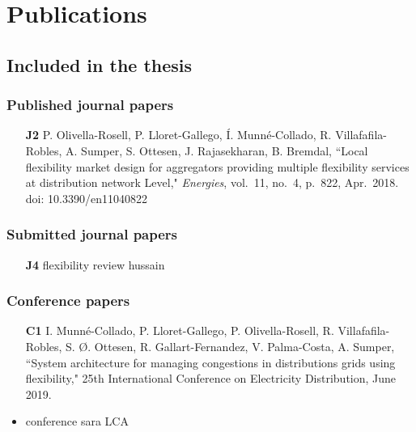 \chapter{Publications}


\section*{Included in the thesis}
\subsection*{Published journal papers}

\begin{itemize}
	
	\item [\textbf{J2}] P. Olivella-Rosell, P. Lloret-Gallego, \'{I}. Munn\'{e}-Collado, R. Villafafila-Robles, A. Sumper, S. Ottesen, J. Rajasekharan, B. Bremdal, ``Local flexibility market design for aggregators providing multiple flexibility services at distribution network Level," \textit{Energies}, vol.~11, no.~4, p.~822, Apr.~2018. doi: 10.3390/en11040822

	
\end{itemize}

\subsection*{Submitted journal papers}
\begin{itemize}
	\item [\textbf{J4}] flexibility review hussain
\end{itemize}
\subsection*{Conference papers}

\begin{itemize}
	
	\item[\textbf{C1}] I. Munn\'{e}-Collado, P. Lloret-Gallego, P. Olivella-Rosell, R. Villafafila-Robles, S. \O{}. Ottesen, R. Gallart-Fernandez, V. Palma-Costa, A. Sumper, ``System architecture for managing congestions in distributions grids using flexibility," 25th International Conference on Electricity Distribution, June 2019.
	\item conference sara LCA 
	
	
\end{itemize}

